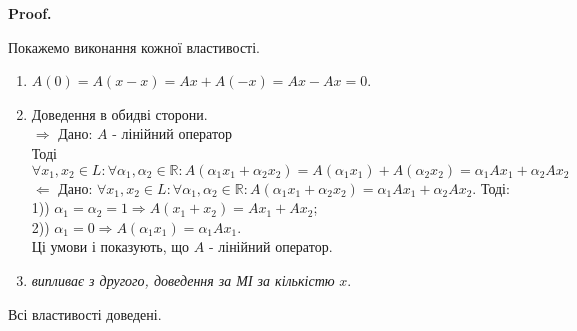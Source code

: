 \documentclass[a4paper, 10pt]{article}
\makeatletter
\def\rightproof{$\boxed{\Rightarrow}$ }
\def\leftproof{$\boxed{\Leftarrow}$ }
\theoremstyle{theoremdd}
\renewenvironment{proof}[1][Proof.\\]{\par
\pushQED{\hfill \qed}%
\normalfont \topsep6\p@\@plus6\p@\relax
\trivlist
\item\relax
{\bfseries
#1\@addpunct{.}}\hspace\labelsep\ignorespaces
}{%
\popQED\endtrivlist\@endpefalse
}
\makeatother
\begin{document}
	\begin{proof}
	Покажемо виконання кожної властивості.
	\begin{enumerate}[topsep=-\parskip, wide=0pt, label={\arabic*)}]
	\item $A(0) = A(x - x) = Ax + A(-x) = Ax - Ax = 0$.
	\item Доведення в обидві сторони.\\
	\rightproof Дано: $A$ - лінійний оператор\\
	Тоді $\forall x_1,x_2 \in L: \forall \alpha_1, \alpha_2 \in \mathbb{R}: A(\alpha_1 x_1 + \alpha_2 x_2) = A(\alpha_1 x_1) + A(\alpha_2 x_2) = \alpha_1 Ax_1 + \alpha_2 Ax_2$
	\bigskip \\
	\leftproof Дано: $\forall x_1,x_2 \in L: \forall \alpha_1, \alpha_2 \in \mathbb{R}: A(\alpha_1 x_1 + \alpha_2 x_2) = \alpha_1 Ax_1 + \alpha_2 Ax_2$. Тоді:\\
	1)) $\alpha_1 = \alpha_2 = 1 \Rightarrow A(x_1 + x_2) = Ax_1 + Ax_2$;\\
	2)) $\alpha_1 = 0 \Rightarrow A(\alpha_1 x_1) = \alpha_1 Ax_1$.\\
	Ці умови і показують, що $A$ - лінійний оператор.
	\item \textit{випливає з другого, доведення за МІ за кількістю} $x$.
	\end{enumerate}
	Всі властивості доведені.
	\end{proof}
	
\end{document}
